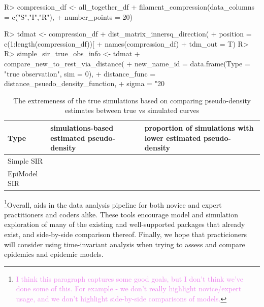 \documentclass[
  shortnames]{jss}
\begin{document}
\begin{CodeChunk}
\begin{CodeInput}
R> compression_df <- all_together_df %
+   filament_compression(data_columns = c("S","I","R"), 
+                        number_points = 20)
\end{CodeInput}
\end{CodeChunk}

\begin{CodeChunk}
\begin{CodeInput}
R> tdmat <- compression_df %
+   dist_matrix_innersq_direction(
+     position = c(1:length(compression_df))[
+       names(compression_df) %
+     tdm_out = T)
R> 
R> simple_sir_true_obs_info <- tdmat %
+   compare_new_to_rest_via_distance(
+     new_name_id = data.frame(Type = "true observation", sim = 0),
+     distance_func = distance_psuedo_density_function, 
+     sigma = "20%
\end{CodeInput}
\end{CodeChunk}

\begin{CodeChunk}
\begin{table}[!h]

\caption{\label{tab:hags-extreme}The extremeness of the true simulations based on comparing pseudo-density estimates between true vs simulated curves}
\centering
\begin{tabular}[t]{l>{\raggedleft\arraybackslash}p{6cm}>{\raggedleft\arraybackslash}p{6cm}}
\toprule
Type & simulations-based estimated pseudo-density & proportion of simulations with lower estimated pseudo-density\\
\midrule
Simple SIR & 0.0036733 & 0.00\\
EpiModel SIR & 0.0149686 & 0.02\\
\bottomrule
\end{tabular}
\end{table}

\end{CodeChunk}

\footnote{\textcolor{violet}{I think this paragraph captures some good goals, but I don't think we've done some of this. For example - we don't really highlight novice/expert usage, and we don't highlight side-by-side comparisons of models.}}Overall,
 aids in the data analysis pipeline for both novice and
expert practitioners and coders alike. These tools encourage model and
simulation exploration of many of the existing and well-supported
packages that already exist, and side-by-side comparison thereof.
Finally, we hope that practicioners will consider using time-invariant
analysis when trying to assess and compare epidemics and epidemic
models.
\end{document}

